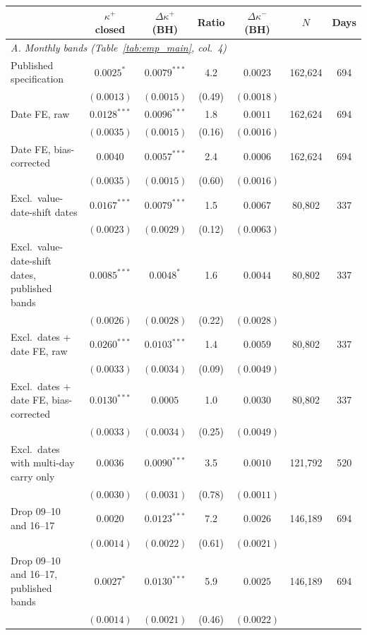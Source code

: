 \begin{tabular}{lcccccc}
\toprule
 & $\kappa^+$ closed & $\Delta\kappa^+$ (BH) & Ratio & $\Delta\kappa^-$ (BH) & $N$ & Days \\
\midrule
\multicolumn{7}{l}{\emph{A. Monthly bands (Table~\ref{tab:emp_main}, col.\ 4)}} \\
Published specification & $0.0025^{*}$ & $0.0079^{***}$ & 4.2 & $0.0023$ & 162,624 & 694 \\
 & $(0.0013)$ & $(0.0015)$ & (0.49) & $(0.0018)$ & & \\
Date FE, raw & $0.0128^{***}$ & $0.0096^{***}$ & 1.8 & $0.0011$ & 162,624 & 694 \\
 & $(0.0035)$ & $(0.0015)$ & (0.16) & $(0.0016)$ & & \\
Date FE, bias-corrected & $0.0040$ & $0.0057^{***}$ & 2.4 & $0.0006$ & 162,624 & 694 \\
 & $(0.0035)$ & $(0.0015)$ & (0.60) & $(0.0016)$ & & \\
Excl.\ value-date-shift dates & $0.0167^{***}$ & $0.0079^{***}$ & 1.5 & $0.0067$ & 80,802 & 337 \\
 & $(0.0023)$ & $(0.0029)$ & (0.12) & $(0.0063)$ & & \\
Excl.\ value-date-shift dates, published bands & $0.0085^{***}$ & $0.0048^{*}$ & 1.6 & $0.0044$ & 80,802 & 337 \\
 & $(0.0026)$ & $(0.0028)$ & (0.22) & $(0.0028)$ & & \\
Excl.\ dates + date FE, raw & $0.0260^{***}$ & $0.0103^{***}$ & 1.4 & $0.0059$ & 80,802 & 337 \\
 & $(0.0033)$ & $(0.0034)$ & (0.09) & $(0.0049)$ & & \\
Excl.\ dates + date FE, bias-corrected & $0.0130^{***}$ & $0.0005$ & 1.0 & $0.0030$ & 80,802 & 337 \\
 & $(0.0033)$ & $(0.0034)$ & (0.25) & $(0.0049)$ & & \\
Excl.\ dates with multi-day carry only & $0.0036$ & $0.0090^{***}$ & 3.5 & $0.0010$ & 121,792 & 520 \\
 & $(0.0030)$ & $(0.0031)$ & (0.78) & $(0.0011)$ & & \\
Drop 09--10 and 16--17 & $0.0020$ & $0.0123^{***}$ & 7.2 & $0.0026$ & 146,189 & 694 \\
 & $(0.0014)$ & $(0.0022)$ & (0.61) & $(0.0021)$ & & \\
Drop 09--10 and 16--17, published bands & $0.0027^{*}$ & $0.0130^{***}$ & 5.9 & $0.0025$ & 146,189 & 694 \\
 & $(0.0014)$ & $(0.0021)$ & (0.46) & $(0.0022)$ & & \\

\end{tabular}
